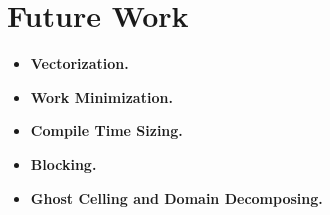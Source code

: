 \section{Future Work}\label{sec:future}

\begin{itemize}
  \item \textbf{Vectorization.}

  \item \textbf{Work Minimization.}

  \item \textbf{Compile Time Sizing.}

  \item \textbf{Blocking.}

  \item \textbf{Ghost Celling and Domain Decomposing.}
\end{itemize}
